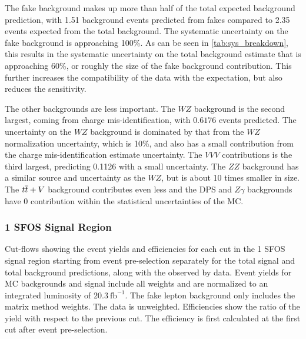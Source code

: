 The fake background makes up more than half of the total expected background
prediction, with 1.51 background events predicted from fakes compared to 
2.35 events expected from the total background.  The systematic
uncertainty on the fake background is approaching 100\%.
As can be seen in \tab\ref{tab:sys_breakdown}, this results in the
systematic uncertainty on the total background estimate 
that is approaching 60\%, or roughly the size of the fake
background contribution.
This further increases the compatibility 
of the data with the expectation, but also reduces the sensitivity.

The other backgrounds are less important. The $WZ$ background
is the second largest, coming from charge mis-identification, 
with $0.6176$ events predicted. The uncertainty on the $WZ$
background is dominated by that from the $WZ$ normalization uncertainty,
which is 10\%, and also has a small contribution from the 
charge mis-identification estimate uncertainty.
The $VVV$ contributions is the third largest, predicting 0.1126
with a small uncertainty.
The $ZZ$ background has a similar source and 
uncertainty as the $WZ$, but is about 10 times
smaller in size. The $t\overline{t}+V$ background contributes even less
and the DPS and $Z\gamma$ backgrounds have
0 contribution within the statistical uncertainties of the MC.



\subsubsection{1 SFOS Signal Region}

\begin{table}[ht!]
\small
\centering

\caption{Cut-flows showing the event yields and efficiencies for each cut in the 1 SFOS signal region
starting from event pre-selection separately for the total signal and total background predictions, along with the observed by data. 
Event yields for MC backgrounds and signal include all weights and are normalized to an integrated luminosity of $20.3~\mathrm{fb}^{-1}$.  
The fake lepton background only includes the matrix method weights.  The data is unweighted.
Efficiencies show the ratio of the yield with respect
to the previous cut.  The efficiency is first calculated at the first cut after event pre-selection.  }
\label{tab:cutflow_weighted_1sfos}
\end{table}

